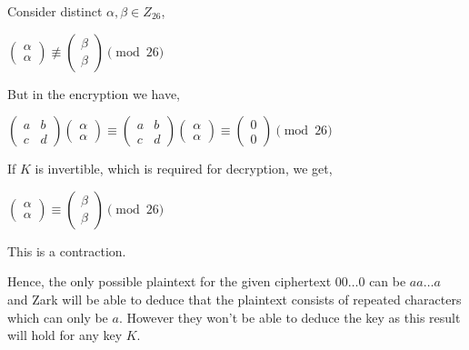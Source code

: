 \documentclass{ashoka-crypto}
\begin{document}
\begin{enumerate}[label=(\alph*)]
Consider distinct $\alpha, \beta \in Z_{26}$,

\begin{center}
\begin{math}
\begin{pmatrix}
\alpha\\
\alpha
\end{pmatrix}
\not\equiv 
\begin{pmatrix}
\beta\\
\beta
\end{pmatrix}
\pmod{26}
\end{math}

But in the encryption we have,

\begin{math}
\begin{pmatrix}
a & b \\
c & d
\end{pmatrix}
\begin{pmatrix}
\alpha \\
\alpha
\end{pmatrix}
\equiv 
\begin{pmatrix}
a & b \\
c & d
\end{pmatrix}
\begin{pmatrix}
\alpha \\
\alpha
\end{pmatrix}
\equiv 
\begin{pmatrix}
0 \\
0
\end{pmatrix}
\pmod{26}
\end{math}

If $K$ is invertible, which is required for decryption, we get,

\begin{math}
\begin{pmatrix}
\alpha \\
\alpha
\end{pmatrix}
\equiv 
\begin{pmatrix}
\beta \\
\beta
\end{pmatrix}
\pmod{26}
\end{math}

\end{center}

This is a contraction.

Hence, the only possible plaintext for the given ciphertext $00\dots 0$ can be $aa\dots a$ and Zark will be able to deduce that the plaintext consists of repeated characters which can only be $a$. However they won't be able to deduce the key as this result will hold for any key $K$.
\end{enumerate}
\end{document}
